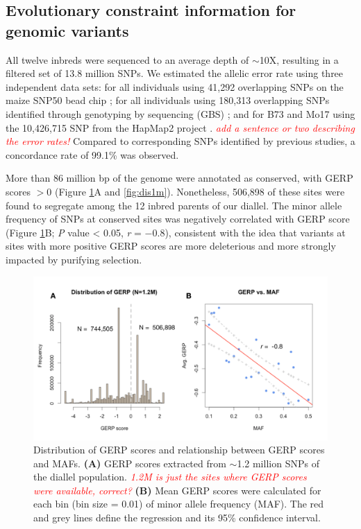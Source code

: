 \documentclass[9pt,twocolumn,twoside]{gsajnl}
\newcommand{\jri}[1]{\textcolor{red}{ \emph{ #1}} }
\begin{document}
\subsection*{Evolutionary constraint information for genomic variants}

All twelve inbreds were sequenced to an average depth of $\sim$10X, resulting in a filtered set of 13.8 million SNPs. 
We estimated the allelic error rate using three independent data sets: for all individuals using 41,292 overlapping SNPs on the maize SNP50 bead chip \citep{Heerwaarden2012}; for all individuals using 180,313 overlapping SNPs identified through genotyping by sequencing (GBS) \citep{Romay2013}; and for B73 and Mo17 using the 10,426,715 SNP from the HapMap2 project \citep{Chia2012}. \jri{add a sentence or two describing the error rates!} Compared to corresponding SNPs identified by previous studies, a concordance rate of 99.1\% was observed.

More than 86 million bp of the genome were annotated as conserved, with GERP scores $>0$ (Figure \ref{fig:gerpmaf}A and \ref{fig:dis1m}).
Nonetheless, 506,898 of these sites were found to segregate among the 12 inbred parents of our diallel.
The minor allele frequency of SNPs at conserved sites was negatively correlated with GERP score (Figure \ref{fig:gerpmaf}B; \emph{P} value < 0.05, \emph{r} = $-0.8$), consistent with the idea that variants at sites with more positive GERP scores are more deleterious and more strongly impacted by purifying selection.

\begin{figure}[htbp]
\centering
\includegraphics[width=\linewidth]{Figure_gerpmaf.pdf}
\caption{Distribution of GERP scores and relationship between GERP scores and MAFs. \textbf{(A)} GERP scores extracted from $\sim$1.2 million SNPs of the diallel population. \jri{1.2M is just the sites where GERP scores were available, correct?} \textbf{(B)} Mean GERP scores were calculated for each bin (bin size = 0.01) of minor allele frequency (MAF). The red  and grey lines define the regression and its 95\% confidence interval.}
\label{fig:gerpmaf}
\end{figure}
\end{document}

